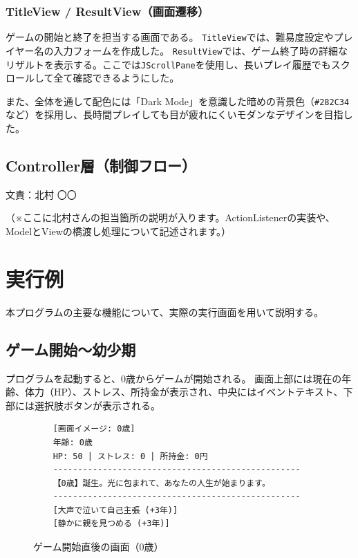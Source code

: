 \documentclass[a4paper,11pt]{jsarticle}
\begin{document}
\subsubsection{TitleView / ResultView（画面遷移）}
ゲームの開始と終了を担当する画面である。
\texttt{TitleView}では、難易度設定やプレイヤー名の入力フォームを作成した。
\texttt{ResultView}では、ゲーム終了時の詳細なリザルトを表示する。ここでは\texttt{JScrollPane}を使用し、長いプレイ履歴でもスクロールして全て確認できるようにした。

また、全体を通して配色には「Dark Mode」を意識した暗めの背景色（\texttt{\#282C34}など）を採用し、長時間プレイしても目が疲れにくいモダンなデザインを目指した。

\subsection{Controller層（制御フロー）}
\begin{flushright}
文責：北村 〇〇
\end{flushright}
（※ここに北村さんの担当箇所の説明が入ります。ActionListenerの実装や、ModelとViewの橋渡し処理について記述されます。）

\section{実行例}
本プログラムの主要な機能について、実際の実行画面を用いて説明する。

\subsection{ゲーム開始〜幼少期}
プログラムを起動すると、0歳からゲームが開始される。
画面上部には現在の年齢、体力（HP）、ストレス、所持金が表示され、中央にはイベントテキスト、下部には選択肢ボタンが表示される。

\begin{figure}[H]
    \centering
    \begin{verbatim}
    [画面イメージ: 0歳]
    年齢: 0歳
    HP: 50 | ストレス: 0 | 所持金: 0円
    --------------------------------------------------
    【0歳】誕生。光に包まれて、あなたの人生が始まります。
    --------------------------------------------------
    [大声で泣いて自己主張 (+3年)]
    [静かに親を見つめる (+3年)]
    \end{verbatim}
    \caption{ゲーム開始直後の画面（0歳）}
\end{figure}
\end{document}
